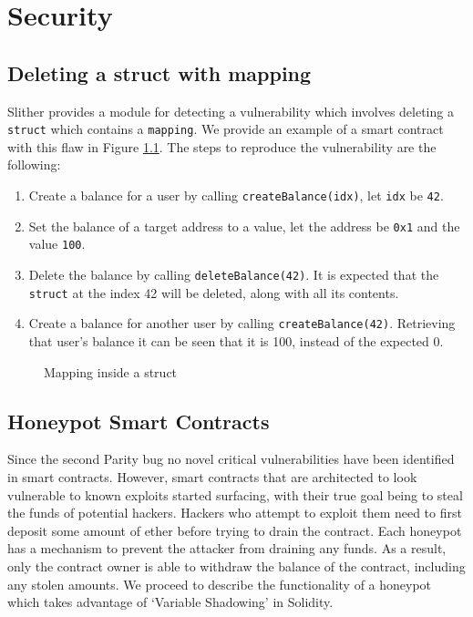 \chapter{Security}

\section{Deleting a struct with mapping} \label{apx:security:mapping}

Slither provides a module for detecting a vulnerability which involves deleting a \texttt{struct} which contains a \texttt{mapping}. We provide an example of a smart contract with this flaw in Figure \ref{fig:mapping-struct}. The steps to reproduce the vulnerability are the following:

\begin{enumerate}
    \item Create a balance for a user by calling \texttt{createBalance(idx)}, let \texttt{idx} be \texttt{42}.
    \item Set the balance of a target address to a value, let the address be \texttt{0x1} and the value \texttt{100}.
    \item Delete the balance by calling \texttt{deleteBalance(42)}. It is expected that the \texttt{struct} at the index 42 will be deleted, along with all its contents.
    \item Create a balance for another user by calling \texttt{createBalance(42)}. Retrieving that user's balance it can be seen that it is 100, instead of the expected 0.
\end{enumerate}

\begin{figure}[htb]
    \centering
    
    \caption{Mapping inside a struct}
    \label{fig:mapping-struct}
\end{figure}

\section{Honeypot Smart Contracts} \label{honeypots}

Since the second Parity bug no novel critical vulnerabilities have been identified in smart contracts. However, smart contracts that are architected to look vulnerable to known exploits started surfacing, with their true goal being to steal the funds of potential hackers. Hackers who attempt to exploit them need to first deposit some amount of ether before trying to drain the contract. Each honeypot has a mechanism to prevent the attacker from draining any funds. As a result, only the contract owner is able to withdraw the balance of the contract, including any stolen amounts. We proceed to describe the functionality of a honeypot which takes advantage of `Variable Shadowing' in Solidity. 

